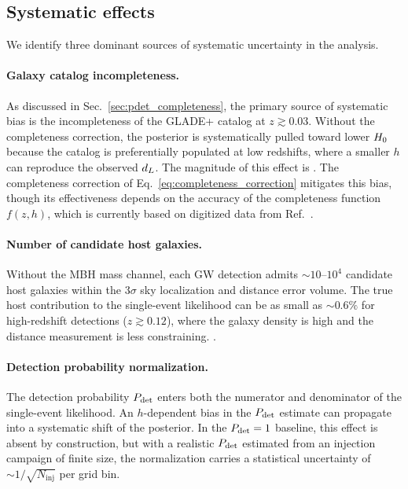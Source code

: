 \subsection{Systematic effects}
\label{sec:systematics}

We identify three dominant sources of systematic uncertainty in the
analysis.

\paragraph{Galaxy catalog incompleteness.}
As discussed in Sec.~\ref{sec:pdet_completeness}, the primary source of
systematic bias is the incompleteness of the GLADE+ catalog at
$z \gtrsim 0.03$. Without the completeness correction, the posterior is
systematically pulled toward lower $H_0$ because the catalog is
preferentially populated at low redshifts, where a smaller $h$ can
reproduce the observed $d_L$. The magnitude of this effect is
. The completeness
correction of Eq.~\eqref{eq:completeness_correction} mitigates this bias,
though its effectiveness depends on the accuracy of the completeness
function $f(z, h)$, which is currently based on digitized data from
Ref.~\cite{Dalya:2021ewn}.

\paragraph{Number of candidate host galaxies.}
Without the MBH mass channel, each GW detection admits $\sim 10$--$10^4$
candidate host galaxies within the $3\sigma$ sky localization and distance
error volume. The true host contribution to the single-event likelihood
can be as small as $\sim 0.6\%$ for high-redshift detections
($z \gtrsim 0.12$), where the galaxy density is high and the distance
measurement is less constraining.
.

\paragraph{Detection probability normalization.}
The detection probability $P_\mathrm{det}$ enters both the numerator and
denominator of the single-event likelihood. An $h$-dependent bias in the
$P_\mathrm{det}$ estimate can propagate into a systematic shift of the posterior.
In the $P_\mathrm{det} = 1$ baseline, this effect is absent by construction, but
with a realistic $P_\mathrm{det}$ estimated from an injection campaign of
finite size, the normalization carries a statistical uncertainty of
$\sim 1/\sqrt{N_\mathrm{inj}}$ per grid bin.

